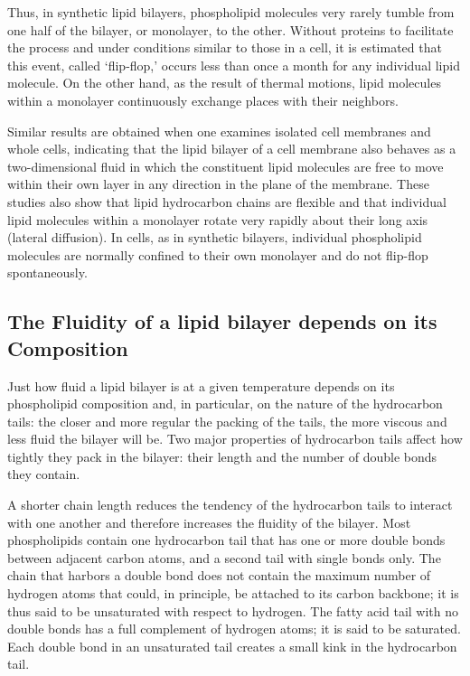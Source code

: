 Thus, in synthetic lipid bilayers, phospholipid molecules very rarely tumble from one half of the bilayer,
or monolayer, to the other. Without proteins to facilitate the process
and under conditions similar to those in a cell, it is estimated that this
event, called ‘flip-flop,’ occurs less than once a month for any individual
lipid molecule. On the other hand, as the result of thermal motions, lipid
molecules within a monolayer continuously exchange places with their neighbors.

Similar results are obtained when one examines isolated cell membranes
and whole cells, indicating that the lipid bilayer of a cell membrane
also behaves as a two-dimensional fluid in which the constituent lipid
molecules are free to move within their own layer in any direction in the
plane of the membrane. These studies also show that lipid hydrocarbon
chains are flexible and that individual lipid molecules within a monolayer
rotate very rapidly about their long axis (lateral diffusion). In cells, as in synthetic bilayers,
individual phospholipid molecules are normally confined to their own
monolayer and do not flip-flop spontaneously.

\subsection{The Fluidity of a lipid bilayer depends on its Composition}

Just how fluid a lipid
bilayer is at a given temperature depends on its phospholipid composition
and, in particular, on the nature of the hydrocarbon tails: the closer
and more regular the packing of the tails, the more viscous and less fluid
the bilayer will be. Two major properties of hydrocarbon tails affect how
tightly they pack in the bilayer: their length and the number of double
bonds they contain.

A shorter chain length reduces the tendency of the hydrocarbon tails
to interact with one another and therefore increases the fluidity of the
bilayer.
Most phospholipids contain one hydrocarbon tail that has one or more
double bonds between adjacent carbon atoms, and a second tail with
single bonds only. The chain that harbors a double bond
does not contain the maximum number of hydrogen atoms that could, in
principle, be attached to its carbon backbone; it is thus said to be unsaturated
with respect to hydrogen. The fatty acid tail with no double bonds
has a full complement of hydrogen atoms; it is said to be saturated. Each
double bond in an unsaturated tail creates a small kink in the hydrocarbon tail.

